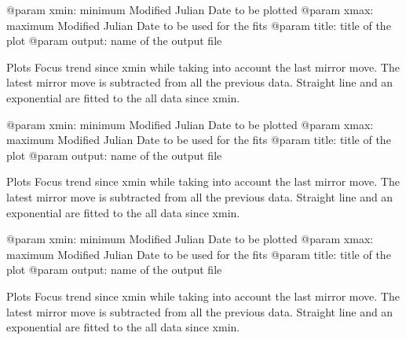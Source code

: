 \documentclass[letterpaper,10pt,english]{sphinxmanual}
\begin{document}

\begin{fulllineitems}
\label{SamPy.focus:SamPy.focus.FocusPlots.FocusTrendRemoveLatestMovement}
@param xmin: minimum Modified Julian Date to be plotted
@param xmax: maximum Modified Julian Date to be used for the fits
@param title: title of the plot
@param output: name of the output file

Plots Focus trend since xmin while taking into account the last mirror move.
The latest mirror move is subtracted from all the previous data.
Straight line and an exponential are fitted to the all data since xmin.

\end{fulllineitems}



\begin{fulllineitems}
\label{SamPy.focus:SamPy.focus.FocusPlots.FocusTrendRemoveLatestMovementNoBreathing}
@param xmin: minimum Modified Julian Date to be plotted
@param xmax: maximum Modified Julian Date to be used for the fits
@param title: title of the plot
@param output: name of the output file

Plots Focus trend since xmin while taking into account the last mirror move.
The latest mirror move is subtracted from all the previous data.
Straight line and an exponential are fitted to the all data since xmin.

\end{fulllineitems}



\begin{fulllineitems}
\label{SamPy.focus:SamPy.focus.FocusPlots.FocusTrendRemoveLatestMovementNoBreathingOffset}
@param xmin: minimum Modified Julian Date to be plotted
@param xmax: maximum Modified Julian Date to be used for the fits
@param title: title of the plot
@param output: name of the output file

Plots Focus trend since xmin while taking into account the last mirror move.
The latest mirror move is subtracted from all the previous data.
Straight line and an exponential are fitted to the all data since xmin.

\end{fulllineitems}
\end{document}
